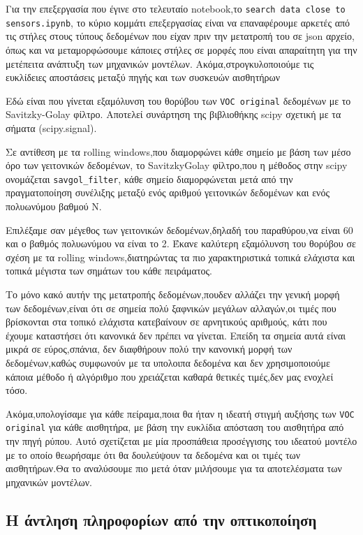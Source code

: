 

Για την επεξεργασία που έγινε στο τελευταίο notebook,το \texttt{search data close to sensors.ipynb},
το κύριο κομμάτι επεξεργασίας είναι να επαναφέρουμε αρκετές από τις στήλες στους τύπους δεδομένων που είχαν πριν την μετατροπή του σε json αρχείο,
όπως και να μεταμορφώσουμε κάποιες στήλες σε μορφές που είναι απαραίτητη για την μετέπειτα ανάπτυξη των μηχανικών μοντέλων.
Ακόμα,στρογκυλοποιούμε τις ευκλίδειες αποστάσεις μεταξύ πηγής και των συσκευών αισθητήρων 

Εδώ είναι που γίνεται εξαμόλυνση του θορύβου των \texttt{VOC original} δεδομένων με το Savitzky-Golay φίλτρο.
Αποτελεί συνάρτηση της βιβλιοθήκης scipy σχετική με τα σήματα (scipy.signal).

Σε αντίθεση με τα rolling windows,που διαμορφώνει κάθε σημείο με βάση των μέσο όρο των γειτονικών δεδομένων,
το Savitzky\-Golay φίλτρο,που η μέθοδος στην scipy ονομάζεται \texttt{savgol\_filter},
κάθε σημείο διαμορφώνεται μετά από την πραγματοποίηση συνέλιξης μεταξύ ενός αριθμού γειτονικών δεδομένων 
και ενός πολυωνύμου βαθμού N.

Επιλέξαμε σαν μέγεθος των γειτονικών δεδομένων,δηλαδή του παραθύρου,να είναι 60 και ο βαθμός πολυωνύμου να είναι το 2.
Έκανε καλύτερη εξαμόλυνση του θορύβου σε σχέση με τα rolling windows,διατηρώντας τα πιο χαρακτηριστικά
τοπικά ελάχιστα και τοπικά μέγιστα των σημάτων του κάθε πειράματος.

Το μόνο κακό αυτήν της μετατροπής δεδομένων,πουδεν αλλάζει την γενική μορφή των δεδομένων,είναι ότι σε σημεία
πολύ ξαφνικών μεγάλων αλλαγών,οι τιμές που βρίσκονται στα τοπικό ελάχιστα κατεβαίνουν σε αρνητικούς αριθμούς,
κάτι που έχουμε καταστήσει ότι κανονικά δεν πρέπει να γίνεται.
Επείδη τα σημεία αυτά είναι μικρά σε εύρος,σπάνια, δεν διαφθήρουν πολύ την κανονική μορφή των δεδομένων,καθώς συμφωνούν με τα υπολοιπα δεδομένα και δεν χρησιμοποιούμε
κάποια μέθοδο ή αλγόριθμο που χρειάζεται καθαρά θετικές τιμές,δεν μας ενοχλεί τόσο.

Ακόμα,υπολογίσαμε για κάθε πείραμα,ποια θα ήταν η ιδεατή στιγμή αυξήσης των \texttt{VOC original} για κάθε αισθητήρα,
με βάση την ευκλίδια απόσταση του αισθητήρα από την πηγή ρύπου.
Αυτό σχετίζεται με μία προσπάθεια προσέγγισης του ιδεατού μοντέλο με το οποίο θεωρήσαμε ότι θα δουλεύψουν
τα δεδομένα και οι τιμές των αισθητήρων.Θα το αναλύσουμε πιο μετά όταν μιλήσουμε για τα αποτελέσματα των μηχανικών μοντέλων.


\subsection{Η άντληση πληροφορίων από την οπτικοποίηση}

